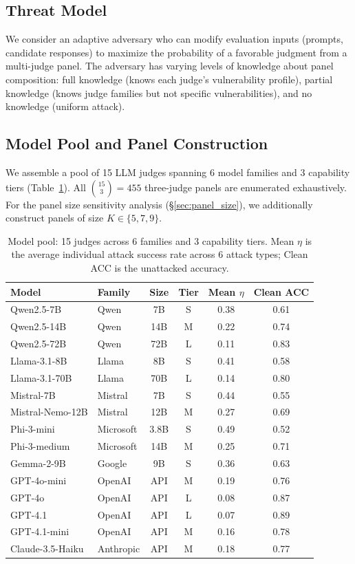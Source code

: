\documentclass[11pt,a4paper]{article}
\begin{document}
\subsection{Threat Model}
We consider an adaptive adversary who can modify evaluation inputs (prompts, candidate responses) to maximize the probability of a favorable judgment from a multi-judge panel.
The adversary has varying levels of knowledge about panel composition: full knowledge (knows each judge's vulnerability profile), partial knowledge (knows judge families but not specific vulnerabilities), and no knowledge (uniform attack).

\subsection{Model Pool and Panel Construction}
\label{sec:models}

We assemble a pool of 15 LLM judges spanning 6 model families and 3 capability tiers (Table~\ref{tab:models}).
All $\binom{15}{3} = 455$ three-judge panels are enumerated exhaustively. For the panel size sensitivity analysis (\S\ref{sec:panel_size}), we additionally construct panels of size $K \in \{5, 7, 9\}$.

\begin{table}[t]
\centering
\caption{Model pool: 15 judges across 6 families and 3 capability tiers. Mean $\eta$ is the average individual attack success rate across 6 attack types; Clean ACC is the unattacked accuracy.}
\label{tab:models}
\small
\begin{tabular}{llcccc}
\toprule
\textbf{Model} & \textbf{Family} & \textbf{Size} & \textbf{Tier} & \textbf{Mean $\eta$} & \textbf{Clean ACC} \\
\midrule
Qwen2.5-7B & Qwen & 7B & S & 0.38 & 0.61 \\
Qwen2.5-14B & Qwen & 14B & M & 0.22 & 0.74 \\
Qwen2.5-72B & Qwen & 72B & L & 0.11 & 0.83 \\
Llama-3.1-8B & Llama & 8B & S & 0.41 & 0.58 \\
Llama-3.1-70B & Llama & 70B & L & 0.14 & 0.80 \\
Mistral-7B & Mistral & 7B & S & 0.44 & 0.55 \\
Mistral-Nemo-12B & Mistral & 12B & M & 0.27 & 0.69 \\
Phi-3-mini & Microsoft & 3.8B & S & 0.49 & 0.52 \\
Phi-3-medium & Microsoft & 14B & M & 0.25 & 0.71 \\
Gemma-2-9B & Google & 9B & S & 0.36 & 0.63 \\
GPT-4o-mini & OpenAI & API & M & 0.19 & 0.76 \\
GPT-4o & OpenAI & API & L & 0.08 & 0.87 \\
GPT-4.1 & OpenAI & API & L & 0.07 & 0.89 \\
GPT-4.1-mini & OpenAI & API & M & 0.16 & 0.78 \\
Claude-3.5-Haiku & Anthropic & API & M & 0.18 & 0.77 \\
\bottomrule
\end{tabular}
\end{table}
\end{document}

